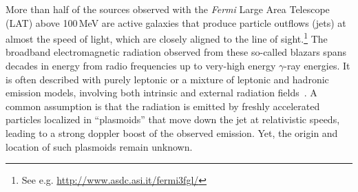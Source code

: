 \documentclass[twocolumn,linenumbers]{aastex62}
\newcommand{\gray}{$\gamma$-ray\xspace}
\newcommand{\Fermi}{\emph{Fermi}\xspace}
\begin{document}
More than half of the sources observed with the \Fermi Large Area Telescope (LAT) above 100\,MeV are active galaxies that produce particle outflows (jets) at almost the speed of light, which are closely aligned to the line of sight.\footnote{See e.g. \url{http://www.asdc.asi.it/fermi3fgl/}}
The broadband electromagnetic radiation observed from these so-called blazars spans decades in energy from radio frequencies up to very-high energy \gray energies. 
It is often described with purely leptonic or a mixture of leptonic and hadronic emission models, involving both intrinsic and external radiation fields~\cite[e.g.,][and references therein]{Madejski:2016oqg}.
A common assumption is that the radiation is emitted by freshly accelerated   particles localized in ``plasmoids''  that move down the jet at relativistic speeds,
 leading to a strong doppler boost of the observed emission. 
Yet, the origin and location of such plasmoids remain unknown. 
\end{document}
